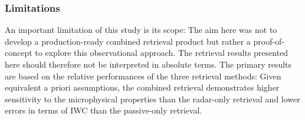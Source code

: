 \documentclass[journal abbreviation, manuscript]{copernicus}
\begin{document}
%
%
%

\subsubsection{Limitations}

An important limitation of this study is its scope: The aim here was not to
develop a production-ready combined retrieval product but rather a
proof-of-concept to explore this observational approach. The retrieval results
presented here should therefore not be interpreted in absolute terms. The
primary results are based on the relative performances of the three retrieval
methods: Given equivalent a priori assumptions, the combined retrieval
demonstrates higher sensitivity to the microphysical properties than the
radar-only retrieval and lower errors in terms of IWC than the passive-only
retrieval.
\end{document}
